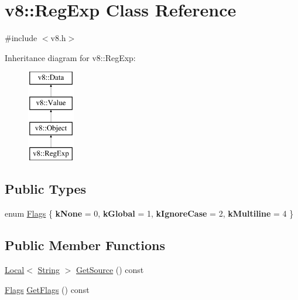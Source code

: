 \hypertarget{classv8_1_1RegExp}{\section{v8\-:\-:Reg\-Exp Class Reference}
\label{classv8_1_1RegExp}
}


{\ttfamily \#include $<$v8.\-h$>$}

Inheritance diagram for v8\-:\-:Reg\-Exp\-:\begin{figure}[H]
\begin{center}
\leavevmode
\includegraphics[height=4.000000cm]{classv8_1_1RegExp}
\end{center}
\end{figure}
\subsection*{Public Types}
\begin{DoxyCompactItemize}
\item 
enum \hyperlink{classv8_1_1RegExp_aa4718a5c1f18472aff3bf51ed694fc5a}{Flags} \{ {\bfseries k\-None} =  0, 
{\bfseries k\-Global} =  1, 
{\bfseries k\-Ignore\-Case} =  2, 
{\bfseries k\-Multiline} =  4
 \}
\end{DoxyCompactItemize}
\subsection*{Public Member Functions}
\begin{DoxyCompactItemize}
\item 
\hyperlink{classv8_1_1Local}{Local}$<$ \hyperlink{classv8_1_1String}{String} $>$ \hyperlink{classv8_1_1RegExp_a448213f2a92d964ed260b51429d5e590}{Get\-Source} () const 
\item 
\hyperlink{classv8_1_1RegExp_aa4718a5c1f18472aff3bf51ed694fc5a}{Flags} \hyperlink{classv8_1_1RegExp_ad5a5e77e6e626b3c7c69eef7ba2908cc}{Get\-Flags} () const 
\end{DoxyCompactItemize}
